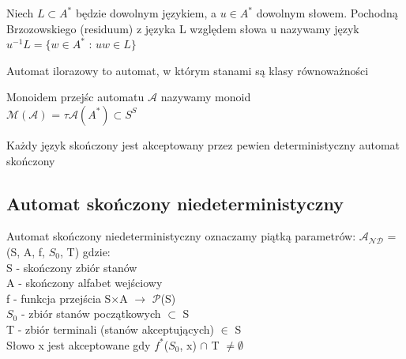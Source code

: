 \documentclass[12pt]{article}
\begin{document}
    \begin{definition}
        Niech $L \subset  A^{*}$ będzie dowolnym językiem, a $u \in A^{*}$ dowolnym słowem.
        Pochodną Brzozowskiego (residuum) z języka L względem słowa u nazywamy język \\
        $u^{-1}L = \{w \in A^{*}$  :  $uw \in L \}$
    \end{definition}

    \begin{definition}
        Automat ilorazowy to automat, w którym stanami są klasy równoważności
    \end{definition}

    \begin{definition}
        Monoidem przejśc automatu $\mathcal{A}$ nazywamy monoid \\
        $\mathcal{M(A)}$ = $\tau \mathcal{A}(A^*) \subset S^{S}$
    \end{definition}

    \begin{definition}
        Każdy język skończony jest akceptowany przez pewien deterministyczny automat skończony
    \end{definition}

    \subsection{Automat skończony niedeterministyczny}
    \begin{definition}
        Automat skończony niedeterministyczny oznaczamy piątką parametrów: $\mathcal{A_{ND}}$ = (S, A, f, $S_{0}$, T) gdzie: \\
        S - skończony zbiór stanów \\
        A - skończony alfabet wejściowy \\
        f - funkcja przejścia S$\times$A $\rightarrow$ $\mathcal{P}$(S) \\
        $S_{0}$ - zbiór stanów początkowych $\subset$ S\\
        T - zbiór terminali (stanów akceptujących) $\in$ S \\

        Słowo x jest akceptowane gdy $f^{*}$($S_{0}$, x) $\cap$ T $\neq \emptyset$
    \end{definition}
\end{document}
